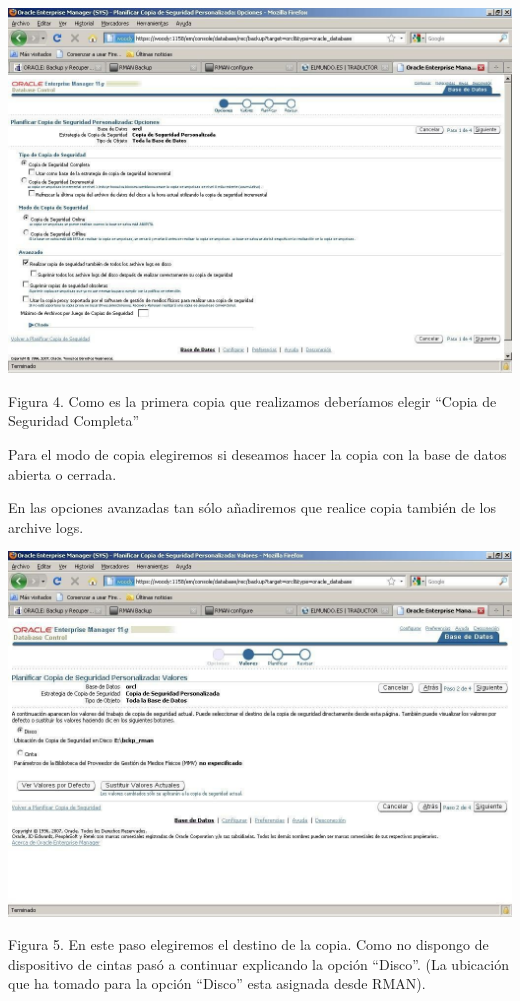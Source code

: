 \documentclass[a4paper,openright,12pt]{book}
\begin{document}
\begin{center}
\includegraphics[width=15cm]{./images/backup/3.jpg}
\end{center}
Figura 4. Como  es  la  primera  copia  que  realizamos  deberíamos  elegir  “Copia  de  Seguridad Completa”

Para el modo de copia elegiremos si deseamos hacer la copia con la base de datos abierta o cerrada.


En las opciones avanzadas tan sólo añadiremos que realice copia también de los archive logs.
\begin{center}
\includegraphics[width=15cm]{./images/backup/4.jpg}
\end{center}

Figura 5. En este paso elegiremos el destino de la copia. Como no dispongo de dispositivo de cintas pasó a continuar explicando la opción “Disco”. (La ubicación que ha tomado para la opción “Disco” esta asignada desde RMAN).
\end{document}
